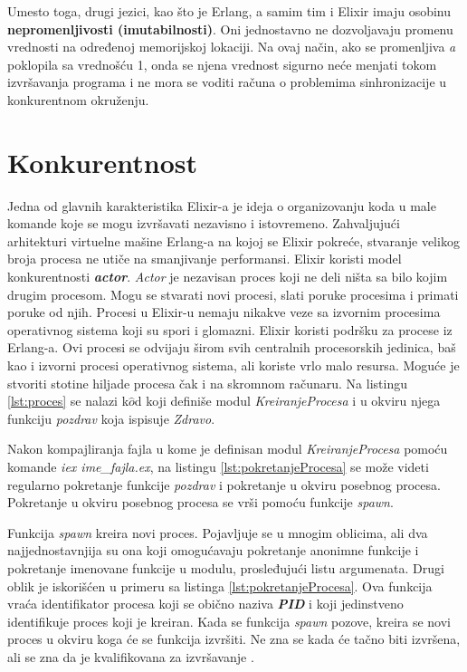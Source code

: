 \documentclass[12pt,oneside]{memoir}
\begin{document}
Umesto toga, drugi jezici, kao što je Erlang, a samim tim i Elixir imaju osobinu \textbf{nepromenljivosti (imutabilnosti)}. Oni jednostavno ne dozvoljavaju promenu vrednosti na određenoj memorijskoj lokaciji. Na ovaj način, ako se promenljiva \textit{a} poklopila sa vrednošću 1, onda se njena vrednost sigurno neće menjati tokom izvršavanja programa i ne mora se voditi računa o problemima sinhronizacije u konkurentnom okruženju.

\section{Konkurentnost}

Jedna od glavnih karakteristika Elixir-a je ideja o organizovanju koda u male komande koje se mogu izvršavati nezavisno i istovremeno. Zahvaljujući arhitekturi virtuelne mašine Erlang-a na kojoj se Elixir pokreće, stvaranje velikog broja procesa ne utiče na smanjivanje performansi. Elixir koristi model konkurentnosti \textit{\textbf{actor}}. \textit{Actor} je nezavisan proces koji ne deli ništa sa bilo kojim drugim procesom. Mogu se stvarati novi procesi, slati poruke procesima i primati poruke od njih. Procesi u Elixir-u nemaju nikakve veze sa izvornim procesima operativnog sistema koji su spori i glomazni. Elixir koristi podršku za procese iz Erlang-a. Ovi procesi se odvijaju širom svih centralnih procesorskih jedinica, baš kao i izvorni procesi operativnog sistema, ali koriste vrlo malo resursa. Moguće je stvoriti stotine hiljade procesa čak i na skromnom računaru. Na listingu \ref{lst:proces} se nalazi k$\hat{o}$d koji definiše modul \textit{KreiranjeProcesa} i u okviru njega funkciju \textit{pozdrav} koja ispisuje \textit{Zdravo}.



\noindent Nakon kompajliranja fajla u kome je definisan modul \textit{KreiranjeProcesa} pomoću komande \textit{iex ime\_fajla.ex}, na listingu \ref{lst:pokretanjeProcesa} se može videti regularno pokretanje funkcije \textit{pozdrav} i pokretanje u okviru posebnog procesa. Pokretanje u okviru posebnog procesa se vrši pomoću funkcije \textit{spawn}.



Funkcija \textit{spawn} kreira novi proces. Pojavljuje se u mnogim oblicima, ali dva najjednostavnjija su ona koji omogućavaju pokretanje anonimne funkcije i pokretanje imenovane funkcije u modulu, prosleđujući listu argumenata. Drugi oblik je iskorišćen u primeru sa listinga \ref{lst:pokretanjeProcesa}. Ova funkcija vraća identifikator procesa koji se obično naziva \textit{\textbf{PID}} i koji jedinstveno identifikuje proces koji je kreiran. Kada se funkcija \textit{spawn} pozove, kreira se novi proces u okviru koga će se funkcija izvršiti. Ne zna se kada će tačno biti izvršena, ali se zna da je kvalifikovana za izvršavanje \cite{ProgrammingElixir}.
\end{document}
